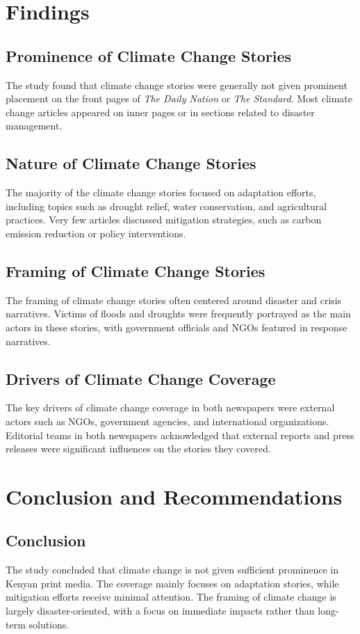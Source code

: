 \documentclass[12pt]{report}
\begin{document}
\chapter{Findings}
\section{Prominence of Climate Change Stories}
    The study found that climate change stories were generally not given prominent placement on the front pages of \textit{The Daily Nation} or \textit{The Standard}. Most climate change articles appeared on inner pages or in sections related to disaster management.

\section{Nature of Climate Change Stories}
    The majority of the climate change stories focused on adaptation efforts, including topics such as drought relief, water conservation, and agricultural practices. Very few articles discussed mitigation strategies, such as carbon emission reduction or policy interventions.

\section{Framing of Climate Change Stories}
    The framing of climate change stories often centered around disaster and crisis narratives. Victims of floods and droughts were frequently portrayed as the main actors in these stories, with government officials and NGOs featured in response narratives.

\section{Drivers of Climate Change Coverage}
    The key drivers of climate change coverage in both newspapers were external actors such as NGOs, government agencies, and international organizations. Editorial teams in both newspapers acknowledged that external reports and press releases were significant influences on the stories they covered.

\chapter{Conclusion and Recommendations}
\section{Conclusion}
    The study concluded that climate change is not given sufficient prominence in Kenyan print media. The coverage mainly focuses on adaptation stories, while mitigation efforts receive minimal attention. The framing of climate change is largely disaster-oriented, with a focus on immediate impacts rather than long-term solutions.
\end{document}
